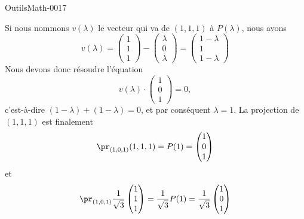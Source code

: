 \begin{corrige}{OutilsMath-0017}
	
	Si nous nommons $v(\lambda)$ le vecteur qui va de $(1,1,1)$ à $P(\lambda)$, nous avons
	\begin{equation}
		v(\lambda)=\begin{pmatrix}
			1	\\ 
			1	\\ 
			1	
		\end{pmatrix}-\begin{pmatrix}
			\lambda	\\ 
			0	\\ 
			\lambda	
		\end{pmatrix}=\begin{pmatrix}
			1-\lambda	\\ 
			1	\\ 
			1-\lambda	
		\end{pmatrix}
	\end{equation}
	Nous devons donc résoudre l'équation
	\begin{equation}
		v(\lambda)\cdot\begin{pmatrix}
			1	\\ 
			0	\\ 
			1	
		\end{pmatrix}=0,
	\end{equation}
	c'est-à-dire $(1-\lambda)+(1-\lambda)=0$, et par conséquent $\lambda=1$. La projection de \( (1,1,1)\) est finalement
	\begin{equation}
		\pr_{(1,0,1)}(1,1,1)=P(1)=\begin{pmatrix}
			1	\\ 
			0	\\ 
			1	
		\end{pmatrix}
	\end{equation}
    et
	\begin{equation}
        \pr_{(1,0,1)}\frac{1}{ \sqrt{3} }\begin{pmatrix}
            1    \\ 
            1    \\ 
            1    
        \end{pmatrix}=\frac{1}{ \sqrt{3} }P(1)=\frac{1}{ \sqrt{3} }\begin{pmatrix}
			1	\\ 
			0	\\ 
			1	
		\end{pmatrix}
	\end{equation}

\end{corrige}
